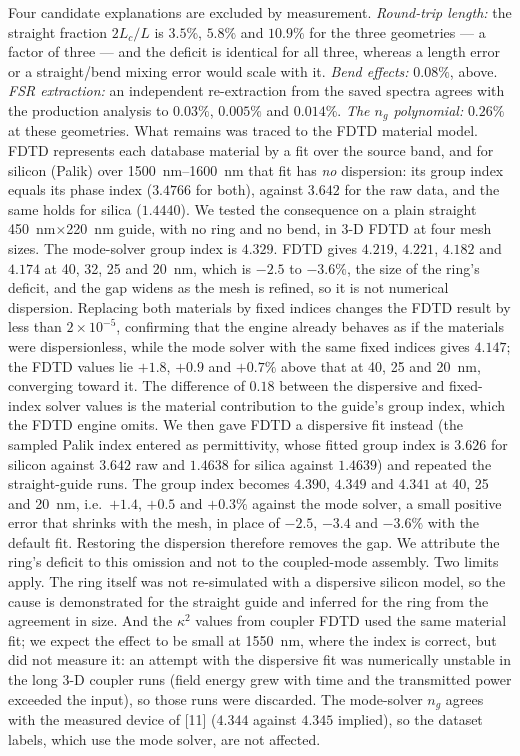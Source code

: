 \documentclass[11pt]{article}
\begin{document}
Four candidate explanations are excluded by measurement. \emph{Round-trip
length:} the straight fraction $2L_c/L$ is $3.5\%$, $5.8\%$ and $10.9\%$ for
the three geometries --- a factor of three --- and the deficit is identical
for all three, whereas a length error or a straight/bend mixing error would
scale with it. \emph{Bend effects:} $0.08\%$, above. \emph{FSR extraction:}
an independent re-extraction from the saved spectra agrees with the
production analysis to $0.03\%$, $0.005\%$ and $0.014\%$. \emph{The $n_g$
polynomial:} $0.26\%$ at these geometries. What remains was traced to the FDTD material model. FDTD represents each database material by a fit over the source band, and for silicon (Palik) over \SIrange{1500}{1600}{nm} that fit has \emph{no} dispersion: its group index equals its phase index ($3.4766$ for both), against $3.642$ for the raw data, and the same holds for silica ($1.4440$). We tested the consequence on a plain straight \SI{450}{nm}$\times$\SI{220}{nm} guide, with no ring and no bend, in 3-D FDTD at four mesh sizes. The mode-solver group index is $4.329$. FDTD gives $4.219$, $4.221$, $4.182$ and $4.174$ at 40, 32, 25 and \SI{20}{nm}, which is $-2.5$ to $-3.6\%$, the size of the ring's deficit, and the gap widens as the mesh is refined, so it is not numerical dispersion. Replacing both materials by fixed indices changes the FDTD result by less than $2\times10^{-5}$, confirming that the engine already behaves as if the materials were dispersionless, while the mode solver with the same fixed indices gives $4.147$; the FDTD values lie $+1.8$, $+0.9$ and $+0.7\%$ above that at 40, 25 and \SI{20}{nm}, converging toward it. The difference of $0.18$ between the dispersive and fixed-index solver values is the material contribution to the guide's group index, which the FDTD engine omits. We then gave FDTD a dispersive fit instead (the sampled Palik index entered as permittivity, whose fitted group index is $3.626$ for silicon against $3.642$ raw and $1.4638$ for silica against $1.4639$) and repeated the straight-guide runs. The group index becomes $4.390$, $4.349$ and $4.341$ at 40, 25 and \SI{20}{nm}, i.e.\ $+1.4$, $+0.5$ and $+0.3\%$ against the mode solver, a small positive error that shrinks with the mesh, in place of $-2.5$, $-3.4$ and $-3.6\%$ with the default fit. Restoring the dispersion therefore removes the gap. We attribute the ring's deficit to this omission and not to the coupled-mode assembly. Two limits apply. The ring itself was not re-simulated with a dispersive silicon model, so the cause is demonstrated for the straight guide and inferred for the ring from the agreement in size. And the $\kappa^2$ values from coupler FDTD used the same material fit; we expect the effect to be small at \SI{1550}{nm}, where the index is correct, but did not measure it: an attempt with the dispersive fit was numerically unstable in the long 3-D coupler runs (field energy grew with time and the transmitted power exceeded the input), so those runs were discarded. The mode-solver $n_g$ agrees with the measured device of [11] ($4.344$ against $4.345$ implied), so the dataset labels, which use the mode solver, are not affected.
\end{document}
